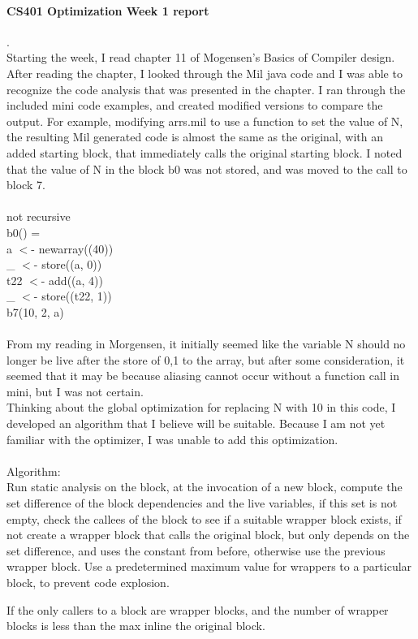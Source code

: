 \documentclass[10pt]{article}
\author{Joel Anna<annajoel@pdx.edu>}
\begin{document}
\paragraph{CS401 Optimization Week 1 report} 
.\\
Starting the week, I read chapter 11 of Mogensen's Basics of Compiler design. After reading the chapter, I looked through the Mil java code and I was able to recognize the code analysis that was presented in the chapter. I ran through the included mini code examples, and created modified versions to compare the output.
For example, modifying arrs.mil to use a function to set the value of N, the resulting
Mil generated code is almost the same as the original, with an added starting block, that
immediately calls the original starting block.
I noted that the value of N in the block b0 was not stored, and was moved to the call to block 7.
\paragraph{}
not recursive\\
b0() = \\
\indent  a $<$- newarray((40))\\
\indent    \_ $<$- store((a, 0))\\
\indent    t22 $<$- add((a, 4))\\
\indent    \_ $<$- store((t22, 1))\\
\indent    b7(10, 2, a)\\
  \paragraph{}
From my reading in Morgensen, it initially seemed like the variable N should no longer be live
after the store of 0,1 to the array, but after some consideration, it seemed that it may be because
aliasing cannot occur without a function call in mini, but I was not certain.
 \\
Thinking about the global optimization for replacing N with 10 in this code, I developed an algorithm
that I believe will be suitable. Because I am not yet familiar with the optimizer, I was unable to add this
optimization.
 \paragraph{}
Algorithm:\\
Run static analysis on the block, at the invocation of a new block, compute the set difference of the block dependencies and the live variables, if this set
is not empty, check the callees of the block to see if a suitable wrapper block exists, if not
create a wrapper block that calls the original block, but only depends on the
set difference, and uses the constant from before, otherwise use the previous wrapper block.
Use a predetermined maximum value for wrappers to a particular block, to prevent code explosion.

If the only callers to a block are wrapper blocks, and the number of wrapper blocks is less than the max
inline the original block.
\end{document}
